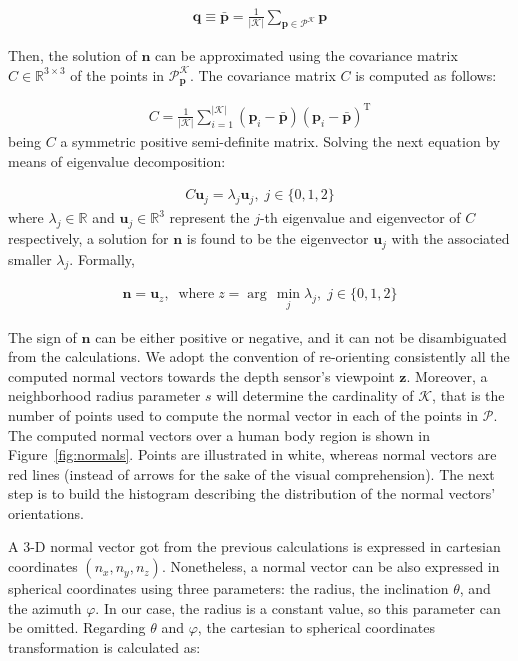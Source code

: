 \documentclass[10pt,twocolumn,letterpaper]{article}
\begin{document}
\begin{gather}
	\mathbf{q} \equiv \bar{\mathbf{p}} = \frac{1}{|\mathcal{K}|} \sum_{\mathbf{p} \in \mathcal{P}^{\mathcal{K}}} \mathbf{p}
\end{gather}
 
Then, the solution of $\mathbf{n}$ can be approximated using the covariance matrix $C \in \mathbb{R}^{3 \times 3}$ of the points in $\mathcal{P}_\mathbf{p}^{\mathcal{K}}$. The covariance matrix $C$ is computed as follows: 

\begin{gather}
	C = \frac{1}{|\mathcal{K}|} \sum_{i=1}^{|\mathcal{K}|} (\mathbf{p}_i - \bar{\mathbf{p}}) (\mathbf{p}_i - \bar{\mathbf{p}})^{\mathrm{T}}
\end{gather}
being $C$ a symmetric positive semi-definite matrix. Solving the next equation by means of eigenvalue decomposition:

\begin{gather}
	C \mathbf{u}_j = \lambda_j \mathbf{u}_j, \; j \in \{0,1,2\}
\end{gather}
where $\lambda_j \in \mathbb{R}$ and $\mathbf{u}_j \in \mathbb{R}^3$ represent the $j$-th eigenvalue and eigenvector of $C$ respectively, a solution for $\mathbf{n}$ is found to be the eigenvector $\mathbf{u}_j$ with the associated smaller $\lambda_j$. Formally,

\begin{gather}
	\mathbf{n} = \mathbf{u}_z, \;\; \mathrm{where}\;  z = \arg\,\min_{j}{\lambda_j},\; j \in \{0,1,2\}
\end{gather}

The sign of $\mathbf{n}$ can be either positive or negative, and it can not be disambiguated from the calculations. We adopt the convention of re-orienting consistently all the computed normal vectors towards the depth sensor's viewpoint $\mathbf{z}$. Moreover, a neighborhood radius parameter $s$ will determine the cardinality of $\mathcal{K}$, that is the number of points used to compute the normal vector in each of the points in $\mathcal{P}$. The computed normal vectors over a human body region is shown in Figure~\ref{fig:normals}. Points are illustrated in white, whereas normal vectors are red lines (instead of arrows for the sake of the visual comprehension). The next step is to build the histogram describing the distribution of the normal vectors' orientations.

A 3-D normal vector got from the previous calculations is expressed in cartesian coordinates $(n_x, n_y, n_z)$. Nonetheless, a normal vector can be also expressed in spherical coordinates using three parameters: the radius, the inclination $\theta$, and the azimuth $\varphi$. In our case, the radius is a constant value, so this parameter can be omitted. Regarding $\theta$ and $\varphi$, the cartesian to spherical coordinates transformation is calculated as:
\end{document}
